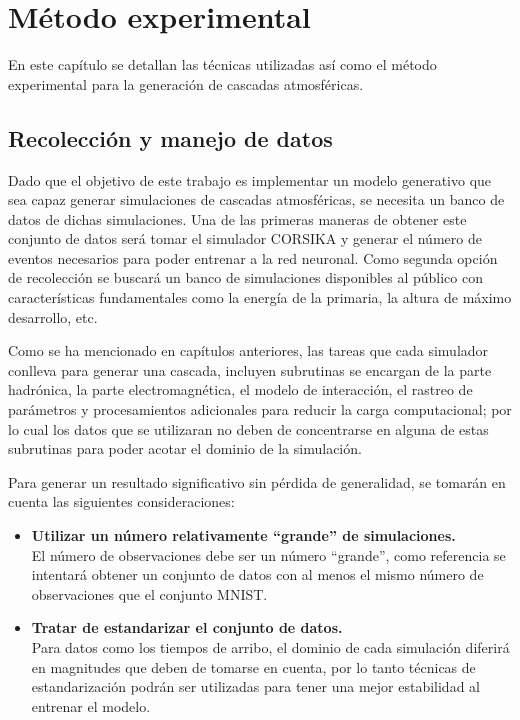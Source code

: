 
\chapter{Método experimental} %

\label{Chapter4} %

En este capítulo se detallan las técnicas utilizadas así como el método experimental para la generación de cascadas atmosféricas.

\section{Recolección y manejo de datos}

Dado que el objetivo de este trabajo es implementar un modelo generativo que sea capaz generar simulaciones de cascadas atmosféricas, se necesita un banco de datos de dichas simulaciones. Una de las primeras maneras de obtener este conjunto de datos será tomar el simulador CORSIKA y generar el número de eventos necesarios para poder entrenar a la red neuronal. Como segunda opción de recolección se buscará un banco de simulaciones disponibles al público con características fundamentales como la energía de la primaria, la altura de máximo desarrollo, etc.

Como se ha mencionado en capítulos anteriores, las tareas que cada simulador conlleva para generar una cascada, incluyen subrutinas se encargan de la parte hadrónica, la parte electromagnética, el modelo de interacción, el rastreo de parámetros y procesamientos adicionales para reducir la carga computacional; por lo cual los datos que se utilizaran no deben de concentrarse en alguna de estas subrutinas para poder acotar el dominio de la simulación. 


Para generar un resultado significativo sin pérdida de generalidad, se tomarán en cuenta las siguientes consideraciones:

\begin{itemize}
    \item \textbf{Utilizar un número relativamente “grande” de simulaciones.}\\
    El número de observaciones debe ser un número “grande”, como referencia se intentará obtener un conjunto de datos con al menos el mismo número de observaciones que el conjunto MNIST.
    \item \textbf{Tratar de estandarizar el conjunto de datos.}\\
    Para datos como los tiempos de arribo, el dominio de cada simulación diferirá en magnitudes que deben de tomarse en cuenta, por lo tanto técnicas de estandarización podrán ser utilizadas para tener una mejor estabilidad al entrenar el modelo. 
\end{itemize}

